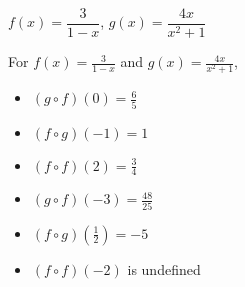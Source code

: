 {$f(x) = \dfrac{3}{1-x}$, $g(x) = \dfrac{4x}{x^2+1}$}
{For  $f(x) = \frac{3}{1-x}$ and $g(x) = \frac{4x}{x^2+1}$,
\begin{multicols}{2}

\begin{itemize}

\item  $(g\circ f)(0) = \frac{6}{5}$

\item  $(f\circ g)(-1) = 1$

\item  $(f \circ f)(2) = \frac{3}{4}$

\item  $(g\circ f)(-3) = \frac{48}{25}$

\item  $(f\circ g)\left(\frac{1}{2}\right) = -5$

\item  $(f \circ f)(-2)$ is undefined

\end{itemize}

\end{multicols}}